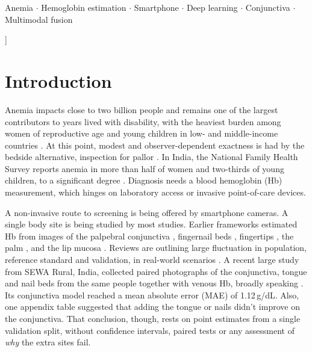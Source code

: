 \documentclass[10pt,a4paper,twocolumn]{article}
\newcommand{\gdl}{\,g/dL}
\begin{document}
\begin{@twocolumnfalse}
\vspace{2mm}
\enspace Anemia $\cdot$ Hemoglobin estimation $\cdot$ Smartphone $\cdot$ Deep learning $\cdot$ Conjunctiva $\cdot$ Multimodal fusion

\vspace{6mm}
\end{@twocolumnfalse}
]

\section{Introduction}

Anemia impacts close to two billion people and remains one of the largest contributors to years lived with disability, with the heaviest burden among women of reproductive age and young children in low- and middle-income countries \cite{gbd2023,kinyoki2021}. At this point, modest and observer-dependent exactness is had by the bedside alternative, inspection for pallor \cite{chalco2005,kalantri2010,stoltzfus1999}. In India, the National Family Health Survey reports anemia in more than half of women and two-thirds of young children, to a significant degree \cite{nfhs5}. Diagnosis needs a blood hemoglobin (Hb) measurement, which hinges on laboratory access or invasive point-of-care devices.

A non-invasive route to screening is being offered by smartphone cameras. A single body site is being studied by most studies. Earlier frameworks estimated Hb from images of the palpebral conjunctiva \cite{collings2016,suner2021,zhao2024}, fingernail beds \cite{mannino2018,mannino2025}, fingertips \cite{wang2016,wang2017}, the palm \cite{appiahene2023,asare2023}, and the lip mucosa \cite{mahmud2023}. Reviews are outlining large fluctuation in population, reference standard and validation, in real-world scenarios \cite{hasan2021,mohamed2024}. A recent large study from SEWA Rural, India, collected paired photographs of the conjunctiva, tongue and nail beds from the same people together with venous Hb, broadly speaking \cite{desai2026,sewa2026}. Its conjunctiva model reached a mean absolute error (MAE) of 1.12\gdl. Also, one appendix table suggested that adding the tongue or nails didn't improve on the conjunctiva. That conclusion, though, rests on point estimates from a single validation split, without confidence intervals, paired tests or any assessment of \emph{why} the extra sites fail.
\end{document}
